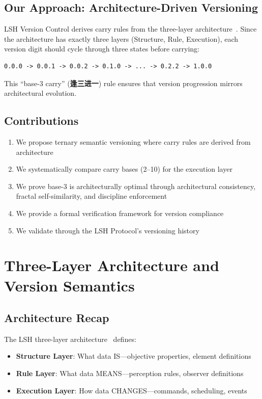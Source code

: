 \documentclass{article}
\begin{document}
\subsection{Our Approach: Architecture-Driven Versioning}

LSH Version Control derives carry rules from the three-layer architecture~\cite{lsh-three-layer}. Since the architecture has exactly three layers (Structure, Rule, Execution), each version digit should cycle through three states before carrying:

\begin{verbatim}
0.0.0 -> 0.0.1 -> 0.0.2 -> 0.1.0 -> ... -> 0.2.2 -> 1.0.0
\end{verbatim}

This ``base-3 carry'' (\textbf{逢三进一}) rule ensures that version progression mirrors architectural evolution.

\subsection{Contributions}

\begin{enumerate}
\item We propose ternary semantic versioning where carry rules are derived from architecture
\item We systematically compare carry bases (2--10) for the execution layer
\item We prove base-3 is architecturally optimal through architectural consistency, fractal self-similarity, and discipline enforcement
\item We provide a formal verification framework for version compliance
\item We validate through the LSH Protocol's versioning history
\end{enumerate}

\section{Three-Layer Architecture and Version Semantics}

\subsection{Architecture Recap}

The LSH three-layer architecture~\cite{lsh-three-layer} defines:

\begin{itemize}
\item \textbf{Structure Layer}: What data IS---objective properties, element definitions
\item \textbf{Rule Layer}: What data MEANS---perception rules, observer definitions
\item \textbf{Execution Layer}: How data CHANGES---commands, scheduling, events
\end{itemize}
\end{document}
